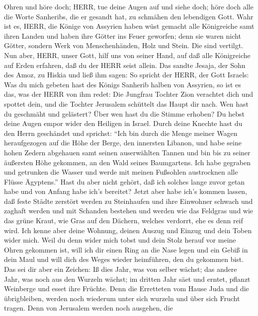 Ohren und höre doch; HERR, tue deine Augen auf und siehe doch; höre doch
alle die Worte Sanheribs, die er gesandt hat, zu schmähen den lebendigen
Gott.  Wahr ist es, HERR, die Könige von Assyrien haben
wüst gemacht alle Königreiche samt ihren Landen  und haben
ihre Götter ins Feuer geworfen; denn sie waren nicht Götter, sondern
Werk von Menschenhänden, Holz und Stein. Die sind vertilgt.
 Nun aber, HERR, unser Gott, hilf uns von seiner Hand, auf
daß alle Königreiche auf Erden erfahren, daß du der HERR seist allein.
 Das sandte Jesaja, der Sohn des Amoz, zu Hiskia und ließ
ihm sagen: So spricht der HERR, der Gott Israels: Was du mich gebeten
hast des Königs Sanherib halben von Assyrien,  so ist es
das, was der HERR von ihm redet: Die Jungfrau Tochter Zion verachtet
dich und spottet dein, und die Tochter Jerusalem schüttelt das Haupt dir
nach.  Wen hast du geschmäht und gelästert? Über wen hast
du die Stimme erhoben? Du hebst deine Augen empor wider den Heiligen in
Israel.  Durch deine Knechte hast du den Herrn geschändet
und sprichst: ``Ich bin durch die Menge meiner Wagen heraufgezogen auf
die Höhe der Berge, den innersten Libanon, und habe seine hohen Zedern
abgehauen samt seinen auserwählten Tannen und bin bis zu seiner
äußersten Höhe gekommen, an den Wald seines Baumgartens. 
Ich habe gegraben und getrunken die Wasser und werde mit meinen
Fußsohlen austrocknen alle Flüsse Ägyptens.''  Hast du aber
nicht gehört, daß ich solches lange zuvor getan habe und von Anfang habe
ich's bereitet? Jetzt aber habe ich's kommen lassen, daß feste Städte
zerstört werden zu Steinhaufen  und ihre Einwohner schwach
und zaghaft werden und mit Schanden bestehen und werden wie das Feldgras
und wie das grüne Kraut, wie Gras auf den Dächern, welches verdorrt, ehe
es denn reif wird.  Ich kenne aber deine Wohnung, deinen
Auszug und Einzug und dein Toben wider mich.  Weil du denn
wider mich tobst und dein Stolz herauf vor meine Ohren gekommen ist,
will ich dir einen Ring an die Nase legen und ein Gebiß in dein Maul und
will dich des Weges wieder heimführen, den du gekommen bist.
 Das sei dir aber ein Zeichen: Iß dies Jahr, was von selber
wächst; das andere Jahr, was noch aus den Wurzeln wächst; im dritten
Jahr säet und erntet, pflanzt Weinberge und esset ihre Früchte.
 Denn die Erretteten vom Hause Juda und die übrigbleiben,
werden noch wiederum unter sich wurzeln und über sich Frucht tragen.
 Denn von Jerusalem werden noch ausgehen, die
